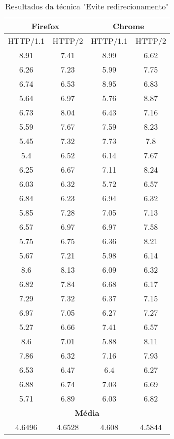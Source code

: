 \begin{table}[h]
	\centering
	\caption{Resultados da técnica "Evite redirecionamento"}
	\label{resultados-redirecionamento}
	\begin{tabular}{cccc}
		\hline
		\multicolumn{2}{c}{\textbf{Firefox}} & \multicolumn{2}{c}{\textbf{Chrome}} \\
		\hline
		HTTP/1.1 & HTTP/2 & HTTP/1.1 & HTTP/2 \\
		\hline
		8.91 & 7.41 & 8.99 & 6.62 \\
		6.26 & 7.23 & 5.99 & 7.75 \\
		6.74 & 6.53 & 8.95 & 6.83 \\
		5.64 & 6.97 & 5.76 & 8.87 \\
		6.73 & 8.04 & 6.43 & 7.16 \\
		5.59 & 7.67 & 7.59 & 8.23 \\
		5.45 & 7.32 & 7.73 & 7.8 \\
		5.4 & 6.52 & 6.14 & 7.67 \\
		6.25 & 6.67 & 7.11 & 8.24 \\
		6.03 & 6.32 & 5.72 & 6.57 \\
		6.84 & 6.23 & 6.94 & 6.32 \\
		5.85 & 7.28 & 7.05 & 7.13 \\
		6.57 & 6.97 & 6.97 & 7.58 \\
		5.75 & 6.75 & 6.36 & 8.21 \\
		5.67 & 7.21 & 5.98 & 6.14 \\ 
		8.6 & 8.13 & 6.09 & 6.32 \\
		6.82 & 7.84 & 6.68 & 6.17 \\
		7.29 & 7.32 & 6.37 & 7.15 \\
		6.97 & 7.05 & 6.27 & 7.27 \\
		5.27 & 6.66 & 7.41 & 6.57 \\
		8.6 & 7.01 & 5.88 & 8.11 \\
		7.86 & 6.32 & 7.16 & 7.93 \\
		6.53 & 6.47 & 6.4 & 6.27 \\
		6.88 & 6.74 & 7.03 & 6.69 \\
		5.71 & 6.89 & 6.03 & 6.82 \\
		\hline
		\multicolumn{4}{c}{\textbf{Média}} \\
		4.6496 & 4.6528 & 4.608 & 4.5844 \\
		\hline
	\end{tabular}
\end{table}